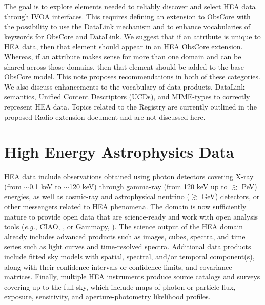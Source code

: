 \documentclass[11pt,a4paper]{ivoa}
\begin{document}
The goal is to explore elements needed to reliably discover and select \gls{HEA} data through \gls{IVOA} interfaces. This requires defining an extension to ObsCore with the possibility to use the DataLink mechanism and to enhance vocabularies of keywords for ObsCore and DataLink. We suggest that if an attribute is unique to \gls{HEA} data, then that element should appear in an \gls{HEA} ObsCore extension. Whereas, if an attribute makes sense for more than one domain and can be shared across those domains, then that element should be added to the base ObsCore model. This note proposes recommendations in both of these categories. We also discuss enhancements to the vocabulary of data\/ products, DataLink semantics, Unified Content Descriptors (UCDs), and MIME-types to correctly represent \gls{HEA} data. Topics related to the Registry are currently outlined in the proposed Radio extension document and are not discussed here.


\pagebreak
\section{High Energy Astrophysics Data}

\gls{HEA} data include observations obtained using photon detectors covering X-ray (from $\sim$0.1 keV to $\sim$120 keV) through gamma-ray (from 120 keV up to $\gtrsim$ PeV) energies, as well as cosmic-ray and astrophysical neutrino ($\gtrsim$ GeV) detectors, or other messengers related to \gls{HEA} phenomena. The domain is now sufficiently mature to provide open data that are science-ready and work with open analysis tools ({\em e.g.\/}, CIAO, \citealt{2026ApJ..1005..116F}, or Gammapy, \citealt{gammapy:2023}). The science output of the \gls{HEA} domain already includes advanced products such as images, cubes, spectra, and time series such as light curves and time-resolved spectra. Additional data products include fitted sky models with spatial, spectral, and/or temporal component(s), along with their confidence intervals or confidence limits, and covariance matrices.   Finally, multiple \gls{HEA} instruments produce source catalogs and surveys covering up to the full sky, which include maps of photon or particle flux, exposure, sensitivity, and aperture-photometry likelihood profiles.
\end{document}
